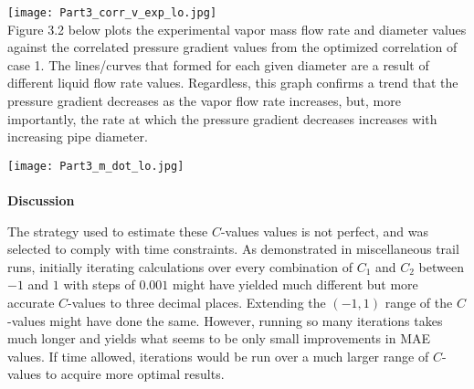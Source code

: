 \texttt{[image: Part3\_corr\_v\_exp\_lo.jpg]}\\

Figure 3.2 below plots the experimental vapor mass flow rate and diameter values against the correlated pressure gradient values from the optimized correlation of case 1. The lines/curves that formed for each given diameter are a result of different liquid flow rate values. Regardless, this graph confirms a trend that the pressure gradient decreases as the vapor flow rate increases, but, more importantly, the rate at which the pressure gradient decreases increases with increasing pipe diameter.

\texttt{[image: Part3\_m\_dot\_lo.jpg]}\\
\\
\textbf{Discussion}

The strategy used to estimate these \(C\)-values values is not perfect, and was selected to comply with time constraints. As demonstrated in miscellaneous trail runs, initially iterating calculations over every combination of \(C_1\) and \(C_2\) between \(-1\) and \(1\) with steps of \(0.001\) might have yielded much different but more accurate \(C\)-values to three decimal places. Extending the \((-1,1)\) range of the \(C\)-values might have done the same. However, running so many iterations takes much longer and yields what seems to be only small improvements in MAE values. If time allowed, iterations would be run over a much larger range of \(C\)-values to acquire more optimal results. 




